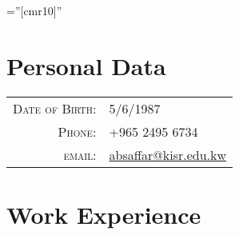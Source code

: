 \documentclass[a4paper,10pt]{article} %
\begin{document}
\pagestyle{empty} %

\font\fb=''[cmr10]'' %


\par{\bigskip\par} %

\section{Personal Data}

\begin{tabular}{rl}
	\textsc{Date of Birth:} & 5/6/1987 \\
	\textsc{Phone:} & +965 2495 6734\\
	\textsc{email:} & \href{mailto:absaffar@kisr.edu.kw}{absaffar@kisr.edu.kw}
\end{tabular}


\section{Work Experience}
\end{document}

